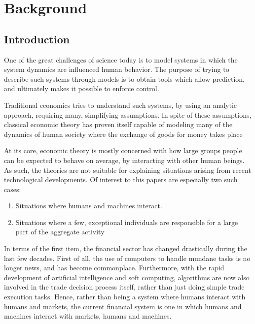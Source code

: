 \chapter{Background}
\begin{comment}
Many models of artificial markets resemble typical game theoretic models in that all trading is round based. Typically all agents receive the market information and evaluate their strategies once every round. Such models are very useful when all agents are more or less equally fast, since it is then reasonable to assume that they have access to the same information. 

The model proposed in this work is different from such models in that it assumes that agents generally do \textit{not} have access to the same information when they evaluate their strategies. 
\end{comment}



\section{Introduction}
One of the great challenges of science today is to model systems in which the system dynamics are influenced  human behavior. The purpose of trying to describe such systems through models is to obtain tools which allow prediction, and ultimately makes it possible to enforce control.

Traditional economics tries to understand such systems, by using an analytic approach, requiring many, simplifying assumptions. In spite of these assumptions, classical economic theory has proven itself capable of modeling many of the dynamics of human society where the exchange of goods for money takes place

At its core, economic theory is mostly concerned with how large groups people can be expected to behave on average, by interacting with other human beings. As such, the theories are not suitable for explaining situations arising from recent technological developments. Of interest to this papers are especially two such cases:
\begin{enumerate}
\item Situations where humans and machines interact.
\item Situations where a few, exceptional individuals are responsible for a large part of the aggregate activity
\end{enumerate}
In terms of the first item, the financial sector has changed drastically during the last few decades. First of all, the use of computers to handle mundane tasks is no longer news, and has become commonplace. Furthermore, with the rapid development of artificial intelligence and soft computing, algorithms are now also involved in the trade decision process itself, rather than just doing simple trade execution tasks. Hence, rather than being a system where humans interact with humans and markets, the current financial system is one in which humans and machines interact with markets, humans and machines. 

